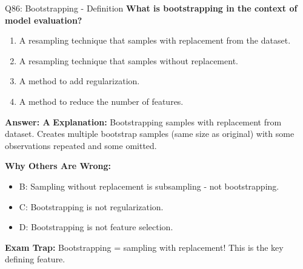 \documentclass[8pt]{beamer}
\begin{document}
	\begin{frame}{Q86: Bootstrapping - Definition}
		\fontsize{6.5}{7.5}\selectfont
		\textbf{What is bootstrapping in the context of model evaluation?}
		
		\begin{enumerate}
			\item A resampling technique that samples with replacement from the dataset.
			\item A resampling technique that samples without replacement.
			\item A method to add regularization.
			\item A method to reduce the number of features.
		\end{enumerate}
		
		\vspace{0.05cm}
		\textcolor{myblue}{\textbf{Answer: A}}
		\vspace{0.05cm}
		\textcolor{myblue}{\textbf{Explanation:}} Bootstrapping samples with replacement from dataset. Creates multiple bootstrap samples (same size as original) with some observations repeated and some omitted.
		
		\vspace{0.05cm}
		\textcolor{myred}{\textbf{Why Others Are Wrong:}}
		\begin{itemize}
			\item \textcolor{myred}{B:} Sampling without replacement is subsampling - not bootstrapping.
			\item \textcolor{myred}{C:} Bootstrapping is not regularization.
			\item \textcolor{myred}{D:} Bootstrapping is not feature selection.
		\end{itemize}
		
		\textcolor{myred}{\textbf{Exam Trap:}} Bootstrapping = \textcolor{myblue}{sampling with replacement}! This is the key defining feature.
	\end{frame}
	
\end{document}
